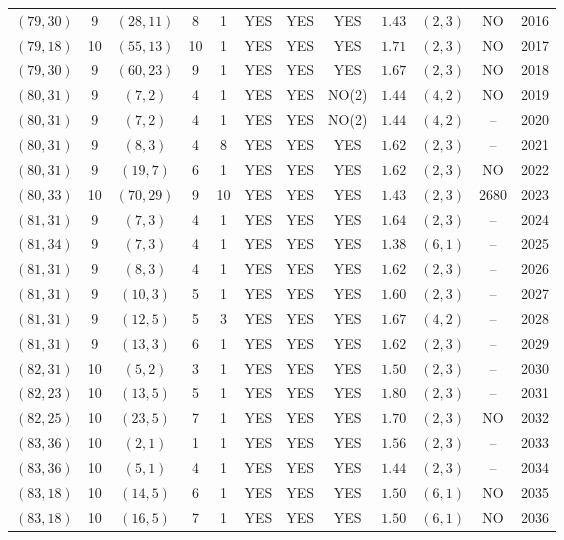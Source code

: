 \begin{longtable}{|c|c|c|c|c|c|c|c|c|c|c|c|}
$(79,30)$ & 9 & $(28,11)$ & 8 & 1 & YES & YES & YES & $1.43$ & $(2,3)$ & NO & 2016\\
$(79,18)$ & 10 & $(55,13)$ & 10 & 1 & YES & YES & YES & $1.71$ & $(2,3)$ & NO & 2017\\
$(79,30)$ & 9 & $(60,23)$ & 9 & 1 & YES & YES & YES & $1.67$ & $(2,3)$ & NO & 2018\\
$(80,31)$ & 9 & $(7,2)$ & 4 & 1 & YES & YES & NO(2) & $1.44$ & $(4,2)$ & NO & 2019\\
$(80,31)$ & 9 & $(7,2)$ & 4 & 1 & YES & YES & NO(2) & $1.44$ & $(4,2)$ & -- & 2020\\
$(80,31)$ & 9 & $(8,3)$ & 4 & 8 & YES & YES & YES & $1.62$ & $(2,3)$ & -- & 2021\\
$(80,31)$ & 9 & $(19,7)$ & 6 & 1 & YES & YES & YES & $1.62$ & $(2,3)$ & NO & 2022\\
$(80,33)$ & 10 & $(70,29)$ & 9 & 10 & YES & YES & YES & $1.43$ & $(2,3)$ & 2680 & 2023\\
$(81,31)$ & 9 & $(7,3)$ & 4 & 1 & YES & YES & YES & $1.64$ & $(2,3)$ & -- & 2024\\
$(81,34)$ & 9 & $(7,3)$ & 4 & 1 & YES & YES & YES & $1.38$ & $(6,1)$ & -- & 2025\\
$(81,31)$ & 9 & $(8,3)$ & 4 & 1 & YES & YES & YES & $1.62$ & $(2,3)$ & -- & 2026\\
$(81,31)$ & 9 & $(10,3)$ & 5 & 1 & YES & YES & YES & $1.60$ & $(2,3)$ & -- & 2027\\
$(81,31)$ & 9 & $(12,5)$ & 5 & 3 & YES & YES & YES & $1.67$ & $(4,2)$ & -- & 2028\\
$(81,31)$ & 9 & $(13,3)$ & 6 & 1 & YES & YES & YES & $1.62$ & $(2,3)$ & -- & 2029\\
$(82,31)$ & 10 & $(5,2)$ & 3 & 1 & YES & YES & YES & $1.50$ & $(2,3)$ & -- & 2030\\
$(82,23)$ & 10 & $(13,5)$ & 5 & 1 & YES & YES & YES & $1.80$ & $(2,3)$ & -- & 2031\\
$(82,25)$ & 10 & $(23,5)$ & 7 & 1 & YES & YES & YES & $1.70$ & $(2,3)$ & NO & 2032\\
$(83,36)$ & 10 & $(2,1)$ & 1 & 1 & YES & YES & YES & $1.56$ & $(2,3)$ & -- & 2033\\
$(83,36)$ & 10 & $(5,1)$ & 4 & 1 & YES & YES & YES & $1.44$ & $(2,3)$ & -- & 2034\\
$(83,18)$ & 10 & $(14,5)$ & 6 & 1 & YES & YES & YES & $1.50$ & $(6,1)$ & NO & 2035\\
$(83,18)$ & 10 & $(16,5)$ & 7 & 1 & YES & YES & YES & $1.50$ & $(6,1)$ & NO & 2036\\

\end{longtable}
